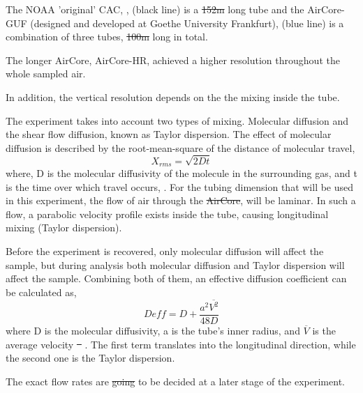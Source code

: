 \documentclass[a4paper,12pt,twoside]{article}
\providecommand{\DIFaddtex}[1]{{\protect\color{blue}\uwave{#1}}} %
\providecommand{\DIFdeltex}[1]{{\protect\color{red}\sout{#1}}}                      %
\providecommand{\DIFaddbegin}{} %
\providecommand{\DIFaddend}{} %
\providecommand{\DIFdelbegin}{} %
\providecommand{\DIFdelend}{} %
\providecommand{\DIFadd}[1]{\texorpdfstring{\DIFaddtex{#1}}{#1}} %
\providecommand{\DIFdel}[1]{\texorpdfstring{\DIFdeltex{#1}}{}} %
\newcommand{\DIFscaledelfig}{0.5}
\newlength{\DIFdelgraphicswidth} %
\newlength{\DIFdelgraphicsheight} %
\newcommand{\DIFaddincludegraphics}[2][]{{\color{blue}\fbox{\DIFOincludegraphics[#1]{#2}}}} %
\newcommand{\DIFdelincludegraphics}[2][]{%
\sbox{\DIFdelgraphicsbox}{\DIFOincludegraphics[#1]{#2}}%
\settoboxwidth{\DIFdelgraphicswidth}{\DIFdelgraphicsbox} %
\settoboxtotalheight{\DIFdelgraphicsheight}{\DIFdelgraphicsbox} %
\scalebox{\DIFscaledelfig}{%
\parbox[b]{\DIFdelgraphicswidth}{\usebox{\DIFdelgraphicsbox}\\[-\baselineskip] \rule{\DIFdelgraphicswidth}{0em}}\llap{\resizebox{\DIFdelgraphicswidth}{\DIFdelgraphicsheight}{%
\setlength{\unitlength}{\DIFdelgraphicswidth}%
\begin{picture}(1,1)%
\thicklines\linethickness{2pt} %
{\color[rgb]{1,0,0}\put(0,0){\framebox(1,1){}}}%
{\color[rgb]{1,0,0}\put(0,0){\line( 1,1){1}}}%
{\color[rgb]{1,0,0}\put(0,1){\line(1,-1){1}}}%
\end{picture}%
}\hspace*{3pt}}} %
} %
\DeclareRobustCommand{\DIFaddbegin}{\DIFOaddbegin \let\includegraphics\DIFaddincludegraphics} %
\DeclareRobustCommand{\DIFaddend}{\DIFOaddend \let\includegraphics\DIFOincludegraphics} %
\DeclareRobustCommand{\DIFdelbegin}{\DIFOdelbegin \let\includegraphics\DIFdelincludegraphics} %
\DeclareRobustCommand{\DIFdelend}{\DIFOaddend \let\includegraphics\DIFOincludegraphics} %
\begin{document}
The NOAA 'original' CAC, \cite{Karion}, (black line) is a \DIFdelbegin \DIFdel{152m }\DIFdelend \DIFaddbegin \DIFadd{152 m }\DIFaddend long tube and the AirCore-GUF (designed and developed at Goethe University Frankfurt), (blue line) is a combination of three tubes, \DIFdelbegin \DIFdel{100m }\DIFdelend \DIFaddbegin \DIFadd{100 m }\DIFaddend long in total.

The longer AirCore, AirCore-HR, achieved a higher resolution throughout the whole sampled air. 

In addition, the vertical resolution depends on the the mixing inside the tube. 

The experiment takes into account two types of mixing. Molecular diffusion and the shear flow diffusion, known as Taylor dispersion. The effect of molecular diffusion is described by the root-mean-square of the distance of molecular travel, 
\begin{equation}
    X_{rms} = \sqrt{2Dt}
\end{equation}
where, D is the molecular diffusivity of the molecule in the surrounding gas, and t is the time over which travel occurs, \cite{Karion}.
For the tubing dimension that will be used in this experiment, the flow of air through the \DIFdelbegin \DIFdel{AirCore}\DIFdelend \DIFaddbegin \DIFadd{CAC}\DIFaddend , will be laminar. In such a flow, a parabolic velocity profile exists inside the tube, causing longitudinal mixing (Taylor dispersion). 
\DIFaddbegin 

\DIFaddend Before the experiment is recovered, only molecular diffusion will affect the sample, but during analysis both molecular diffusion and Taylor dispersion will affect the sample. Combining both of them, an effective diffusion coefficient can be calculated as,
 \begin{equation}
     D{eff} = D + \frac{a^2\overline{V^2}}{48D}
 \end{equation}
where D is the molecular diffusivity, a is the tube's inner radius, and $\overline{V}$ is the average velocity \DIFdelbegin \DIFdel{\mbox{%
\cite{Olivier}}\hspace{0pt}%
}\DIFdelend \DIFaddbegin \DIFadd{\mbox{%
\cite{Membrive}}\hspace{0pt}%
}\DIFaddend . The first term translates into the longitudinal direction, while the second one is the Taylor dispersion.

The exact flow rates are \DIFdelbegin \DIFdel{going }\DIFdelend to be decided at a later stage of the experiment.
\end{document}
